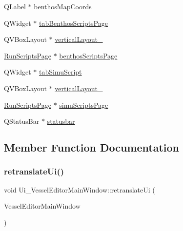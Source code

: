 \begin{DoxyCompactItemize}
Q\+Label $\ast$ \mbox{\hyperlink{class_ui___vessel_editor_main_window_ad6fd0350f8127b722a039b47c0383f7d}{benthos\+Map\+Coords}}
\item 
Q\+Widget $\ast$ \mbox{\hyperlink{class_ui___vessel_editor_main_window_a790f17c0f20a90622782946aeb3598de}{tab\+Benthos\+Scripts\+Page}}
\item 
Q\+V\+Box\+Layout $\ast$ \mbox{\hyperlink{class_ui___vessel_editor_main_window_af6f299e0d93af1e6075d35eb65dabbb2}{vertical\+Layout\+\_}}
\item 
\mbox{\hyperlink{class_run_scripts_page}{Run\+Scripts\+Page}} $\ast$ \mbox{\hyperlink{class_ui___vessel_editor_main_window_aaad958725bca564384e8e85bfbbeee26}{benthos\+Scripts\+Page}}
\item 
Q\+Widget $\ast$ \mbox{\hyperlink{class_ui___vessel_editor_main_window_a0bd4bba404a42ceb1afa9c92921154e9}{tab\+Simu\+Script}}
\item 
Q\+V\+Box\+Layout $\ast$ \mbox{\hyperlink{class_ui___vessel_editor_main_window_a653c6c928743b0d0dcf53d06dd2d1dc2}{vertical\+Layout\+\_}}
\item 
\mbox{\hyperlink{class_run_scripts_page}{Run\+Scripts\+Page}} $\ast$ \mbox{\hyperlink{class_ui___vessel_editor_main_window_aae2cb874c1a47cee8cbdc442a2feb710}{simu\+Scripts\+Page}}
\item 
Q\+Status\+Bar $\ast$ \mbox{\hyperlink{class_ui___vessel_editor_main_window_a697edd7ccb0c471d974bbf4aec2a2f4f}{statusbar}}
\end{DoxyCompactItemize}


\subsection{Member Function Documentation}
\mbox{\label{class_ui___vessel_editor_main_window_acdd21554bdf10bc52f7ab5ff53f80638}} 
\subsubsection{\texorpdfstring{retranslateUi()}{retranslateUi()}}
{\footnotesize\ttfamily void Ui\+\_\+\+Vessel\+Editor\+Main\+Window\+::retranslate\+Ui (\begin{DoxyParamCaption}\item[{Q\+Main\+Window $\ast$}]{Vessel\+Editor\+Main\+Window }\end{DoxyParamCaption})\hspace{0.3cm}{\ttfamily [inline]}}

